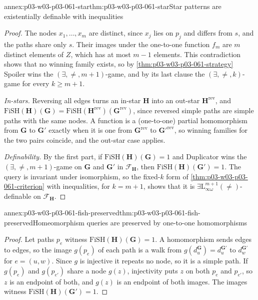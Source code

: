 \begin{annexitem}{annex:p03-w03-p03-061-star}{thm:p03-w03-p03-061-star}{Star patterns are existentially definable with inequalities}
\begin{proof}
The nodes \(x_1,\ldots,x_m\) are distinct, since \(x_j\) lies on \(p_j\) and
differs from \(s\), and the paths share only \(s\). Their images under the
one-to-one function \(f_m\) are \(m\) distinct elements of \(Z\), which has
at most \(m-1\) elements. This contradiction shows that no winning family
exists, so by \cref{thm:p03-w03-p03-061-strategy} Spoiler wins the
\((\exists,\neq,m+1)\)-game, and by its last clause the
\((\exists,\neq,k)\)-game for every \(k\ge m+1\).

\emph{In-stars.} Reversing all edges turns an in-star \(\mathbf H\) into an
out-star \(\mathbf H^{\mathrm{rev}}\), and
\(\mathrm{FiSH}(\mathbf H)(\mathbf G)=\mathrm{FiSH}(\mathbf H^{\mathrm
{rev}})(\mathbf G^{\mathrm{rev}})\), since reversed simple paths are simple
paths with the same nodes. A function is a (one-to-one) partial homomorphism
from \(\mathbf G\) to \(\mathbf G'\) exactly when it is one from
\(\mathbf G^{\mathrm{rev}}\) to \(\mathbf G'^{\mathrm{rev}}\), so winning
families for the two pairs coincide, and the out-star case applies.

\emph{Definability.} By the first part, if
\(\mathrm{FiSH}(\mathbf H)(\mathbf G)=1\) and Duplicator wins the
\((\exists,\neq,m+1)\)-game on \(\mathbf G\) and \(\mathbf G'\) in
\(\mathcal F_{\mathbf H}\), then \(\mathrm{FiSH}(\mathbf H)(\mathbf G')=1\).
The query is invariant under isomorphism, so the fixed-\(k\) form of
\cref{thm:p03-w03-p03-061-criterion} with inequalities, for \(k=m+1\), shows
that it is \(\exists\mathrm L^{m+1}_{\infty\omega}(\neq)\)-definable on
\(\mathcal F_{\mathbf H}\).
\end{proof}
\end{annexitem}

\begin{annexitem}{annex:p03-w03-p03-061-fish-preserved}{thm:p03-w03-p03-061-fish-preserved}{Homeomorphism queries are preserved by one-to-one homomorphisms}
\begin{proof}
Let paths \(p_e\) witness \(\mathrm{FiSH}(\mathbf H)(\mathbf G)=1\). A
homomorphism sends edges to edges, so the image \(g(p_e)\) of each path is a
walk from \(g(d_u^{\mathbf G})=d_u^{\mathbf G'}\) to
\(d_w^{\mathbf G'}\) for \(e=(u,w)\). Since \(g\) is injective it repeats no
node, so it is a simple path. If \(g(p_e)\) and \(g(p_{e'})\) share a node
\(g(z)\), injectivity puts \(z\) on both \(p_e\) and \(p_{e'}\), so \(z\) is
an endpoint of both, and \(g(z)\) is an endpoint of both images. The images
witness \(\mathrm{FiSH}(\mathbf H)(\mathbf G')=1\).
\end{proof}
\end{annexitem}

